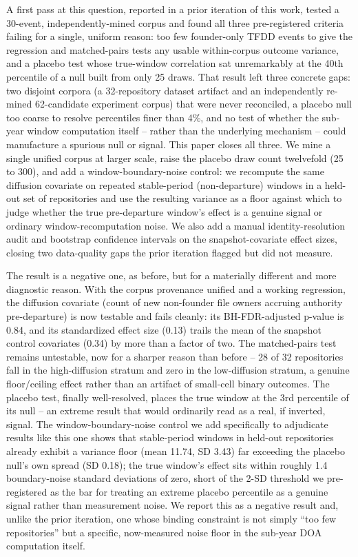\documentclass[11pt,letterpaper]{article}
\begin{document}
A first pass at this question, reported in a prior iteration of this work, tested a 30-event, independently-mined corpus and found all three pre-registered criteria failing for a single, uniform reason: too few founder-only TFDD events to give the regression and matched-pairs tests any usable within-corpus outcome variance, and a placebo test whose true-window correlation sat unremarkably at the 40th percentile of a null built from only 25 draws. That result left three concrete gaps: two disjoint corpora (a 32-repository dataset artifact and an independently re-mined 62-candidate experiment corpus) that were never reconciled, a placebo null too coarse to resolve percentiles finer than 4\%, and no test of whether the sub-year window computation itself -- rather than the underlying mechanism -- could manufacture a spurious null or signal. This paper closes all three. We mine a single unified corpus at larger scale, raise the placebo draw count twelvefold (25 to 300), and add a window-boundary-noise control: we recompute the same diffusion covariate on repeated stable-period (non-departure) windows in a held-out set of repositories and use the resulting variance as a floor against which to judge whether the true pre-departure window's effect is a genuine signal or ordinary window-recomputation noise. We also add a manual identity-resolution audit and bootstrap confidence intervals on the snapshot-covariate effect sizes, closing two data-quality gaps the prior iteration flagged but did not measure.

The result is a negative one, as before, but for a materially different and more diagnostic reason. With the corpus provenance unified and a working regression, the diffusion covariate (count of new non-founder file owners accruing authority pre-departure) is now testable and fails cleanly: its BH-FDR-adjusted p-value is 0.84, and its standardized effect size (0.13) trails the mean of the snapshot control covariates (0.34) by more than a factor of two. The matched-pairs test remains untestable, now for a sharper reason than before -- 28 of 32 repositories fall in the high-diffusion stratum and zero in the low-diffusion stratum, a genuine floor/ceiling effect rather than an artifact of small-cell binary outcomes. The placebo test, finally well-resolved, places the true window at the 3rd percentile of its null -- an extreme result that would ordinarily read as a real, if inverted, signal. The window-boundary-noise control we add specifically to adjudicate results like this one shows that stable-period windows in held-out repositories already exhibit a variance floor (mean 11.74, SD 3.43) far exceeding the placebo null's own spread (SD 0.18); the true window's effect sits within roughly 1.4 boundary-noise standard deviations of zero, short of the 2-SD threshold we pre-registered as the bar for treating an extreme placebo percentile as a genuine signal rather than measurement noise. We report this as a negative result and, unlike the prior iteration, one whose binding constraint is not simply ``too few repositories'' but a specific, now-measured noise floor in the sub-year DOA computation itself.
\end{document}
